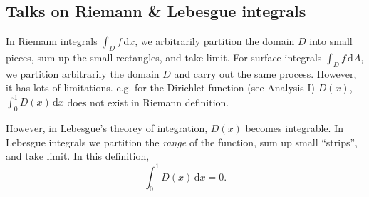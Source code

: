 \subsection{Talks on Riemann \& Lebesgue integrals}
In Riemann integrals $ \int_{D} f \,\mathrm{d}x $, we arbitrarily partition the domain $D$ into small pieces, sum up the small rectangles, and take limit. For surface integrals $ \int_{D} f \,\mathrm{d}A $, we partition arbitrarily the domain $D$ and carry out the same process. However, it has lots of limitations. e.g. for the Dirichlet function (see Analysis I) $D(x)$, $ \int_{0}^{1} D(x) \,\mathrm{d}x $ does not exist in Riemann definition.

However, in Lebesgue's theorey of integration, $D(x)$ becomes integrable. In Lebesgue integrals we partition the \textit{range} of the function, sum up small ``strips'', and take limit. In this definition,
\[
    \int_{0}^{1} D(x) \,\mathrm{d}x=0.
\]